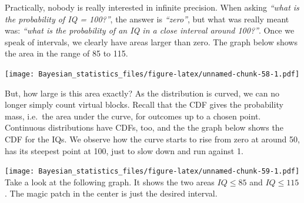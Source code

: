 \documentclass[]{svmono}
\newenvironment{Shaded}{\begin{snugshade}}{\end{snugshade}}
\newcommand{\KeywordTok}[1]{\textcolor[rgb]{0.13,0.29,0.53}{\textbf{#1}}}
\newcommand{\DataTypeTok}[1]{\textcolor[rgb]{0.13,0.29,0.53}{#1}}
\newcommand{\StringTok}[1]{\textcolor[rgb]{0.31,0.60,0.02}{#1}}
\newcommand{\OperatorTok}[1]{\textcolor[rgb]{0.81,0.36,0.00}{\textbf{#1}}}
\newcommand{\NormalTok}[1]{#1}
\theoremstyle{definition}
\theoremstyle{definition}
\theoremstyle{definition}
\theoremstyle{remark}
\begin{document}
Practically, nobody is really interested in infinite precision. When
asking \emph{``what is the probability of IQ = 100?''}, the answer is
\emph{``zero''}, but what was really meant was: \emph{``what is the
probability of an IQ in a close interval around 100?''}. Once we speak
of intervals, we clearly have areas larger than zero. The graph below
shows the area in the range of 85 to 115.

\begin{Shaded}
\end{Shaded}

\texttt{[image: Bayesian\_statistics\_files/figure-latex/unnamed-chunk-58-1.pdf]}

But, how large is this area exactly? As the distribution is curved, we
can no longer simply count virtual blocks. Recall that the CDF gives the
probability mass, i.e.~the area under the curve, for outcomes up to a
chosen point. Continuous distributions have CDFs, too, and the the graph
below shows the CDF for the IQs. We observe how the curve starts to rise
from zero at around 50, has its steepest point at 100, just to slow down
and run against 1.

\begin{Shaded}
\end{Shaded}

\texttt{[image: Bayesian\_statistics\_files/figure-latex/unnamed-chunk-59-1.pdf]}
Take a look at the following graph. It shows the two areas
\(IQ \leq 85\) and \(IQ \leq 115\). The magic patch in the center is
just the desired interval.
\end{document}
